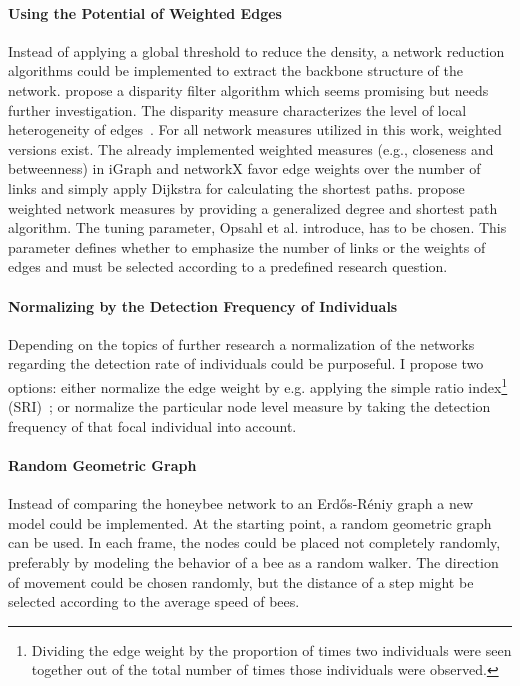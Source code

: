\paragraph{Using the Potential of Weighted Edges}
Instead of applying a global threshold to reduce the density, a network reduction algorithms could be implemented to extract the backbone structure of the network. \textcite{serrano2009extracting} propose a disparity filter algorithm which seems promising but needs further investigation.
The disparity measure characterizes the level of local heterogeneity of edges~\cite{barthelemy2003spatial}. For all network measures utilized in this work, weighted versions exist. The already implemented weighted measures (e.g., closeness and betweenness) in iGraph and networkX favor edge weights over the number of links and simply apply Dijkstra for calculating the shortest paths. \textcite{opsahl2010node} propose weighted network measures by providing a generalized degree and shortest path algorithm. The tuning parameter, Opsahl et al. introduce, has to be chosen. This parameter defines whether to emphasize the number of links or the weights of edges and must be selected according to a predefined research question.

\paragraph{Normalizing by the Detection Frequency of Individuals}
Depending on the topics of further research a normalization of the networks regarding the detection rate of individuals could be purposeful. I propose two options: either normalize the edge weight by e.g. applying the simple ratio index\footnote{Dividing the edge weight by the proportion of times two individuals were seen together out of the total number of times those individuals were observed.} (SRI)~\cite{formica2012fitness}; or normalize the particular node level measure by taking the detection frequency of that focal individual into account.

\paragraph{Random Geometric Graph}
Instead of comparing the honeybee network to an Erd\H{o}s-R\'{e}niy graph a new model could be implemented.  At the starting point, a random geometric graph~\cite{rgg2002} can be used. In each frame, the nodes could be placed not completely randomly, preferably by modeling the behavior of a bee as a random walker. The direction of movement could be chosen randomly, but the distance of a step might be selected according to the average speed of bees.


